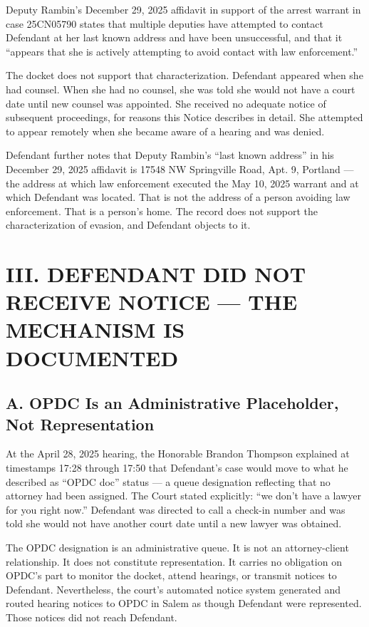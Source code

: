 \documentclass[12pt,letterpaper]{article}
\begin{document}
Deputy Rambin's December 29, 2025 affidavit in support of the arrest warrant in
case 25CN05790 states that multiple deputies have attempted to contact Defendant
at her last known address and have been unsuccessful, and that it ``appears that
she is actively attempting to avoid contact with law enforcement.''

The docket does not support that characterization. Defendant appeared when she
had counsel. When she had no counsel, she was told she would not have a court date
until new counsel was appointed. She received no adequate notice of subsequent
proceedings, for reasons this Notice describes in detail. She attempted to appear
remotely when she became aware of a hearing and was denied.

Defendant further notes that Deputy Rambin's ``last known address'' in his
December 29, 2025 affidavit is 17548 NW Springville Road, Apt. 9, Portland ---
the address at which law enforcement executed the May 10, 2025 warrant and at
which Defendant was located. That is not the address of a person avoiding law
enforcement. That is a person's home. The record does not support the
characterization of evasion, and Defendant objects to it.


\section*{III. DEFENDANT DID NOT RECEIVE NOTICE --- THE MECHANISM IS
DOCUMENTED}

\subsection*{A. OPDC Is an Administrative Placeholder, Not Representation}

At the April 28, 2025 hearing, the Honorable Brandon Thompson explained at
timestamps 17:28 through 17:50 that Defendant's case would move to what he
described as ``OPDC doc'' status --- a queue designation reflecting that no
attorney had been assigned. The Court stated explicitly: ``we don't have a lawyer
for you right now.'' Defendant was directed to call a check-in number and was
told she would not have another court date until a new lawyer was obtained.

The OPDC designation is an administrative queue. It is not an attorney-client
relationship. It does not constitute representation. It carries no obligation on
OPDC's part to monitor the docket, attend hearings, or transmit notices to
Defendant. Nevertheless, the court's automated notice system generated and routed
hearing notices to OPDC in Salem as though Defendant were represented. Those
notices did not reach Defendant.
\end{document}
